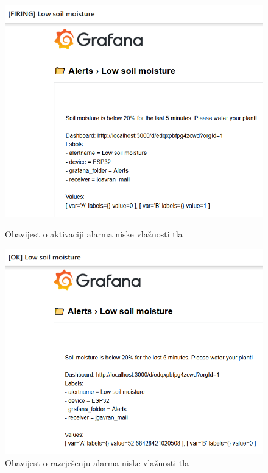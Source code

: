\begin{figure}[ht]
	\begin{minipage}[t]{0.4\textwidth}
		\includegraphics[width=\linewidth]{imgs/firing_low_moisture}
		\caption{Obavijest o aktivaciji alarma niske vlažnosti tla}
		\label{fig:firing_low_moisture}
	\end{minipage}
	\hspace*{\fill}
	\begin{minipage}[t]{0.4\textwidth}
		\includegraphics[width=\linewidth]{imgs/ok_low_moisture}
		\caption{Obavijest o razrješenju alarma niske vlažnosti tla}
		\label{fig:ok_low_moisture}
	\end{minipage}
\end{figure}

